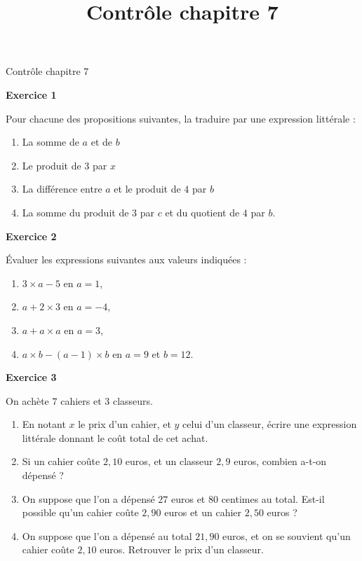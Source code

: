 \documentclass[14pt]{extreport}
\title{Contrôle chapitre 7}
\date{}
\theoremstyle{plain}
\begin{document}
\begin{center}{\Large Contrôle chapitre 7}\end{center}



\textbf{Exercice 1}  %

Pour chacune des propositions suivantes, la traduire par une expression littérale : 

\begin{enumerate}
\item La somme de $a$ et de $b$
\item Le produit de $3$ par $x$
\item La différence entre $a$ et le produit de $4$ par $b$
\item La somme du produit de $3$ par $c$ et du quotient de $4$ par $b$. 
\end{enumerate}


\textbf{Exercice 2} %

Évaluer les expressions suivantes aux valeurs indiquées : 

\begin{enumerate}
\item $3\times a - 5$ en $a=1$, 

\item $a + 2 \times 3$ en $a= -4$, 
\item $a + a \times a$ en $a= 3$, 
\item $ a \times b - (a - 1) \times b $ en $a= 9$ et $b= 12$. 
\end{enumerate}

 \textbf{Exercice 3 }
 
On achète $7$ cahiers et $3$ classeurs.

\begin{enumerate}
\item En notant $x$ le prix d'un cahier, et $y$ celui d'un classeur, écrire une expression littérale donnant le coût total de cet achat. 
\item Si un cahier coûte $2,10$ euros, et un classeur $2,9$ euros, combien a-t-on dépensé ? 
\item On suppose que l'on a dépensé $27$ euros et $80$ centimes au total. Est-il possible qu'un cahier coûte $2,90$ euros et un cahier $2,50$ euros ? 
\item On suppose que l'on a dépensé au total $21,90$ euros, et on se souvient qu'un cahier coûte $2,10$ euros. Retrouver le prix d'un classeur. 
\end{enumerate}
 
\end{document}
